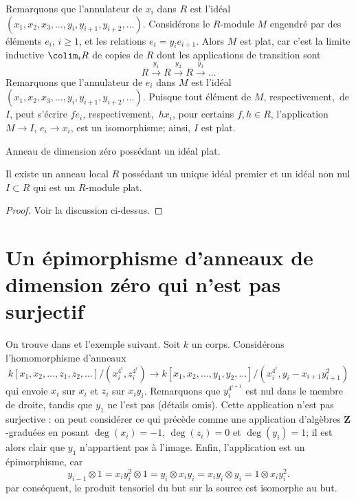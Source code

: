 \medskip\noindent
Remarquons que l'annulateur de $x_i$ dans $R$ est l'idéal
$(x_1, x_2, x_3, \ldots, y_i, y_{i + 1}, y_{i + 2}, \ldots)$.
Considérons le $R$-module $M$ engendré par des éléments $e_i$, $i \geq 1$, et
les relations $e_i = y_i e_{i + 1}$. Alors $M$ est plat, car c'est la
limite inductive $\colim_i R$ de copies de $R$ dont les applications de transition sont
$$
R \xrightarrow{y_1} R \xrightarrow{y_2} R \xrightarrow{y_3} \ldots
$$
Remarquons que l'annulateur de $e_i$ dans $M$ est l'idéal
$(x_1, x_2, x_3, \ldots, y_i, y_{i + 1}, y_{i + 2}, \ldots)$.
Puisque tout élément de $M$, respectivement,\ de $I$, peut s'écrire
$f e_i$, respectivement,\ $h x_i$, pour certains $f, h \in R$, l'application
$M \to I$, $e_i \to x_i$, est un isomorphisme; ainsi, $I$ est plat.

\begin{lemma}
\label{lemma-zero-dimensional-flat-ideal}
\begin{slogan}
Anneau de dimension zéro possédant un idéal plat.
\end{slogan}
Il existe un anneau local $R$ possédant un unique idéal premier
et un idéal non nul $I \subset R$ qui est un $R$-module plat.
\end{lemma}

\begin{proof}
Voir la discussion ci-dessus.
\end{proof}








\section[Épimorphisme d'anneaux de dimension zéro non surjectif]{Un épimorphisme d'anneaux de dimension zéro qui n'est pas surjectif}
\label{section-epimorphism-not-surjective}

\noindent
On trouve dans \cite{Lazard-deux} et \cite{Autour} l'exemple suivant.
Soit $k$ un corps. Considérons l'homomorphisme d'anneaux
$$
k[x_1, x_2, \ldots, z_1, z_2, \ldots]/
(x_i^{4^i}, z_i^{4^i})
\longrightarrow
k[x_1, x_2, \ldots, y_1, y_2, \ldots]/
(x_i^{4^i}, y_i - x_{i + 1}y_{i + 1}^2)
$$
qui envoie $x_i$ sur $x_i$ et $z_i$ sur $x_iy_i$. Remarquons que $y_i^{4^{i + 1}}$
est nul dans le membre de droite, tandis que $y_1$ ne l'est pas (détails omis).
Cette application n'est pas surjective : on peut considérer ce qui précède comme une application
d'algèbres $\mathbf{Z}$-graduées en posant $\deg(x_i) = -1$, $\deg(z_i) = 0$
et $\deg(y_i) = 1$; il est alors clair que $y_1$ n'appartient pas à l'image.
Enfin, l'application est un épimorphisme, car
$$
y_{i - 1} \otimes 1 = x_i y_i^2 \otimes 1 = y_i \otimes x_i y_i =
x_i y_i \otimes y_i = 1 \otimes x_i y_i^2.
$$
par conséquent, le produit tensoriel du but sur la source est isomorphe
au but.

